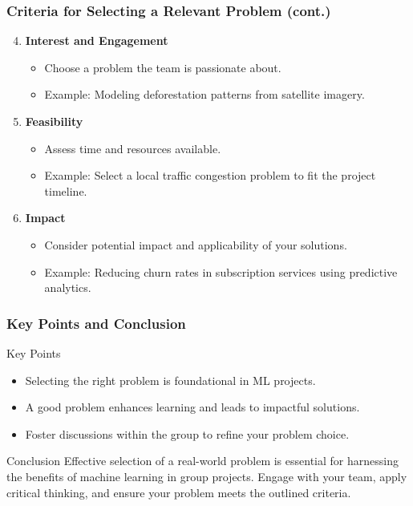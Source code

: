 \documentclass[aspectratio=169]{beamer}
\begin{document}
\begin{frame}[fragile]
    \frametitle{Criteria for Selecting a Relevant Problem (cont.)}
    \begin{enumerate}
        \setcounter{enumi}{3} %
        \item \textbf{Interest and Engagement}
            \begin{itemize}
                \item Choose a problem the team is passionate about.
                \item Example: Modeling deforestation patterns from satellite imagery.
            \end{itemize}
        \item \textbf{Feasibility}
            \begin{itemize}
                \item Assess time and resources available.
                \item Example: Select a local traffic congestion problem to fit the project timeline.
            \end{itemize}
        \item \textbf{Impact}
            \begin{itemize}
                \item Consider potential impact and applicability of your solutions.
                \item Example: Reducing churn rates in subscription services using predictive analytics.
            \end{itemize}
    \end{enumerate}
\end{frame}

\begin{frame}[fragile]
    \frametitle{Key Points and Conclusion}
    \begin{block}{Key Points}
        \begin{itemize}
            \item Selecting the right problem is foundational in ML projects.
            \item A good problem enhances learning and leads to impactful solutions.
            \item Foster discussions within the group to refine your problem choice.
        \end{itemize}
    \end{block}
    
    \begin{block}{Conclusion}
        Effective selection of a real-world problem is essential for harnessing the benefits of machine learning in group projects.
        Engage with your team, apply critical thinking, and ensure your problem meets the outlined criteria.
    \end{block}
\end{frame}
\end{document}
